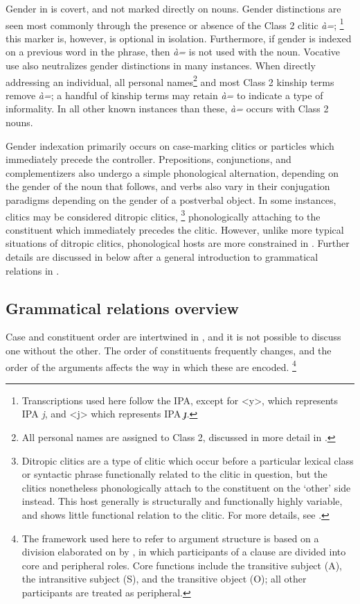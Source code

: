 \documentclass[output=collectionpaper,hidelinks]{langscibook}
\theoremstyle{remark}
\begin{document}
Gender in  is covert, and not marked directly on nouns. Gender distinctions
are seen most commonly through the presence or absence of the Class 2 clitic
\emph{à=};%
\footnote{Transcriptions used here follow the IPA, except for <y>, which
represents IPA \emph{j}, and <j> which represents IPA \emph{ɟ}.} %
this marker is, however, is optional in isolation.  Furthermore, if gender is
indexed on a previous word in the phrase, then \emph{à=} is not used with the
noun.  Vocative use also neutralizes gender distinctions in many instances.
When directly addressing an individual, all personal names\footnote{All personal
names are assigned to Class 2, discussed in more detail in
.} and most Class 2 kinship terms remove \emph{à=}; a
handful of kinship terms may retain \emph{à=} to indicate a type of
informality.  In all other known instances than these, \emph{à=} occurs with
Class 2 nouns.

Gender indexation primarily occurs on case-marking clitics or particles which
immediately precede the controller.  Prepositions, conjunctions, and
complementizers also undergo a simple phonological alternation, depending on the
gender of the noun that follows, and verbs also vary in their conjugation
paradigms depending on the gender of a postverbal object.  In some instances,
clitics may be considered ditropic clitics,%
\footnote{Ditropic clitics are a type of clitic which occur before a particular
lexical class or syntactic phrase functionally related to the clitic in
question, but the clitics nonetheless phonologically attach to the constituent
on the `other' side instead.  This host generally is structurally and
functionally highly variable, and shows little functional relation to the
clitic.  For more details, see \citet{Cysouw_Enclitics_2005}.} %
phonologically attaching to the constituent which immediately precedes the
clitic.  However, unlike more typical situations of ditropic clitics,
phonological hosts are more constrained in .  Further details are discussed
in  below after a general introduction to
grammatical relations in .


\subsection{Grammatical relations overview}
\label{sec:Don:Grammatical_relations_overview}

Case and constituent order are intertwined in , and it is not possible to
discuss one without the other. The order of constituents frequently changes,
and the order of the arguments affects the way in which these are
encoded.%
\footnote{The framework used here to refer to argument structure is based
on a division elaborated on by \citet{Dixon_1994}, in which participants of a
clause are divided into core and peripheral roles. Core functions include the
transitive subject (A), the intransitive subject (S), and the transitive object
(O); all other participants are treated as peripheral.}
\end{document}
